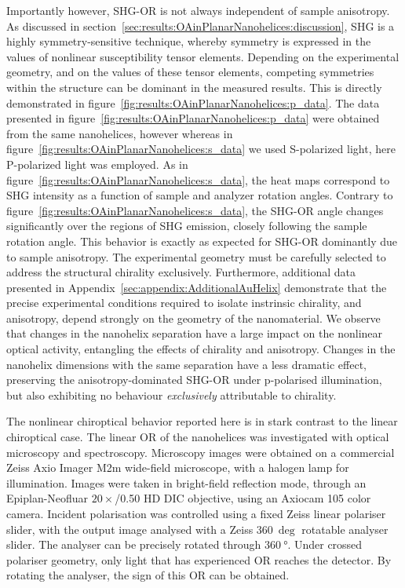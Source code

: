 Importantly however, SHG-OR is not always independent of sample anisotropy. As discussed in section~\ref{sec:results:OAinPlanarNanohelices:discussion}, SHG is a highly symmetry-sensitive technique, whereby symmetry is expressed in the values of nonlinear susceptibility tensor elements. Depending on the experimental geometry, and on the values of these tensor elements, competing symmetries within the structure can be dominant in the measured results. This is directly demonstrated in figure~\ref{fig:results:OAinPlanarNanohelices:p_data}. 
The data presented in figure~\ref{fig:results:OAinPlanarNanohelices:p_data} were obtained from the same nanohelices, however whereas in figure~\ref{fig:results:OAinPlanarNanohelices:s_data} we used S-polarized light, here P-polarized light was employed. As in figure~\ref{fig:results:OAinPlanarNanohelices:s_data}, the heat maps correspond to SHG intensity as a function of sample and analyzer rotation angles. Contrary to figure~\ref{fig:results:OAinPlanarNanohelices:s_data}, the SHG-OR angle changes significantly over the regions of SHG emission, closely following the sample rotation angle. This behavior is exactly as expected for SHG-OR dominantly due to sample anisotropy. The experimental geometry must be carefully selected to address the structural chirality exclusively. 
Furthermore, additional data presented in Appendix~\ref{sec:appendix:AdditionalAuHelix} demonstrate that the precise experimental conditions required to isolate instrinsic chirality, and anisotropy, depend strongly on the geometry of the nanomaterial. We observe that changes in the nanohelix separation have a large impact on the nonlinear optical activity, entangling the effects of chirality and anisotropy. Changes in the nanohelix dimensions with the same separation have a less dramatic effect, preserving the anisotropy-dominated SHG-OR under p-polarised illumination, but also exhibiting no behaviour \textit{exclusively} attributable to chirality.

The nonlinear chiroptical behavior reported here is in stark contrast to the linear chiroptical case. The linear OR of the nanohelices was investigated with optical microscopy and spectroscopy. 
Microscopy images were obtained on a commercial Zeiss Axio Imager M2m wide-field microscope, with a halogen lamp for illumination. Images were taken in bright-field reflection mode, through an Epiplan-Neofluar $20\times$/0.50 HD DIC objective, using an Axiocam 105 color camera. Incident polarisation was controlled using a fixed Zeiss linear polariser slider, with the output image analysed with a Zeiss $\SI{360}{\deg}$ rotatable analyser slider. 
The analyser can be precisely rotated through $\SI{360}{\degree}$. Under crossed polariser geometry, only light that has experienced OR reaches the detector. By rotating the analyser, the sign of this OR can be obtained. 


